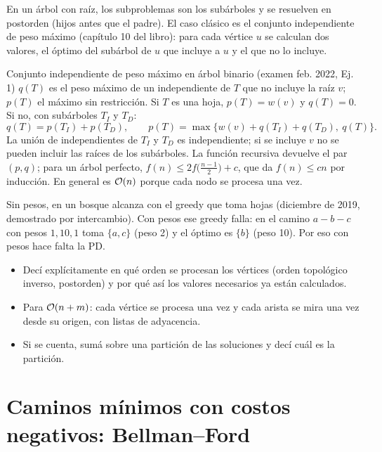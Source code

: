 En un árbol con raíz, los subproblemas son los subárboles y se resuelven en
postorden (hijos antes que el padre). El caso clásico es el conjunto
independiente de peso máximo (capítulo 10 del libro): para cada vértice $u$
se calculan dos valores, el óptimo del subárbol de $u$ que incluye a $u$ y
el que no lo incluye.

\begin{problema}{Conjunto independiente de peso máximo en árbol binario (examen feb. 2022, Ej. 1)}
$q(T)$ es el peso máximo de un independiente de $T$ que no incluye la raíz
$v$; $p(T)$ el máximo sin restricción. Si $T$ es una hoja, $p(T)=w(v)$ y
$q(T)=0$. Si no, con subárboles $T_I$ y $T_D$:
\[
q(T)=p(T_I)+p(T_D),\qquad p(T)=\max\bigl\{w(v)+q(T_I)+q(T_D),\ q(T)\bigr\}.
\]
La unión de independientes de $T_I$ y $T_D$ es independiente; si se incluye
$v$ no se pueden incluir las raíces de los subárboles. La función recursiva
devuelve el par $(p,q)$; para un árbol perfecto,
$f(n)\le2f\bigl(\tfrac{n-1}{2}\bigr)+c$, que da $f(n)\le cn$ por inducción.
En general es $\mathcal{O}(n)$ porque cada nodo se procesa una vez.
\end{problema}

Sin pesos, en un bosque alcanza con el greedy que toma hojas (diciembre
de 2019, demostrado por intercambio). Con pesos ese greedy falla: en el
camino $a-b-c$ con pesos $1,10,1$ toma $\{a,c\}$ (peso 2) y el óptimo es
$\{b\}$ (peso 10). Por eso con pesos hace falta la PD.

\begin{receta}
\begin{itemize}[leftmargin=1.2em]
  \item Decí explícitamente en qué orden se procesan los vértices (orden
  topológico inverso, postorden) y por qué así los valores necesarios ya
  están calculados.
  \item Para $\mathcal{O}(n+m)$: cada vértice se procesa una vez y cada arista se mira
  una vez desde su origen, con listas de adyacencia.
  \item Si se cuenta, sumá sobre una partición de las soluciones y decí cuál
  es la partición.
\end{itemize}
\end{receta}

\section{Caminos mínimos con costos negativos: Bellman--Ford}


